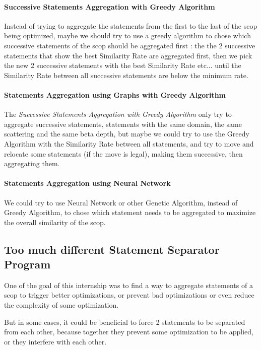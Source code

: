 \documentclass[paper=a4, fontsize=11.5pt]{scrartcl}
\numberwithin{equation}{section}        %
\numberwithin{figure}{section}          %
\numberwithin{table}{section}               %
\begin{document}
        \paragraph{Successive Statements Aggregation with Greedy Algorithm}
            Instead of trying to aggregate the statements from the first to the last
            of the scop being optimized, maybe we should try to use a greedy algorithm
            to chose which successive statements of the scop should be aggregated first : the
            the 2 successive statements that show the best Similarity Rate are aggregated
            first, then we pick the new 2 successive statements with the best Similarity Rate etc...
            until the Similarity Rate between all successive statements are below the minimum rate.\\
        \paragraph{Statements Aggregation using Graphs with Greedy Algorithm}
            The \textit{Successive Statements Aggregation with Greedy Algorithm} only
            try to aggregate successive statements, statements with the same domain,
            the same scattering and the same beta depth, but maybe we could try to
            use the Greedy Algorithm with the Similarity Rate between all statements,
            and try to move and relocate some statements (if the move is legal),
            making them successive, then aggregating them.
        \paragraph{Statements Aggregation using Neural Network}
            We could try to use Neural Network or other Genetic Algorithm, instead
            of Greedy Algorithm, to chose which statement needs to be aggregated to
            maximize the overall similarity of the scop.
    \subsection{Too much different Statement Separator Program}
        One of the goal of this internship was to find a way to aggregate statements
        of a scop to trigger better optimizations, or prevent bad optimizations or even
        reduce the complexity of some optimization.

        But in some cases, it could be beneficial to force 2 statements to be separated
        from each other, because together they prevent some optimization to be applied,
        or they interfere with each other.
\end{document}
